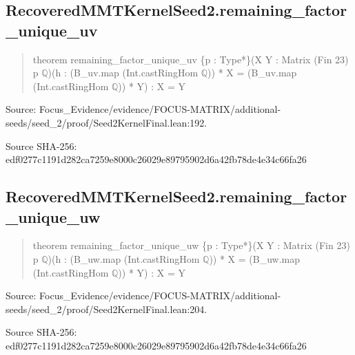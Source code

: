 \documentclass[11pt,a4paper]{article}
\begin{document}
\begin{samepage}
\subsection{RecoveredMMTKernelSeed2.remaining\_factor\_unique\_uv}
\begin{quote}\small\ttfamily theorem remaining\_factor\_unique\_uv \{p : Type*\}\newline     (X Y : Matrix (Fin 23) p \ensuremath{\mathbb{Q}})\newline     (h : (B\_uv.map (Int.castRingHom \ensuremath{\mathbb{Q}})) * X = (B\_uv.map (Int.castRingHom \ensuremath{\mathbb{Q}})) * Y) : X = Y\end{quote}
{\small Source: Focus\_Evidence/evidence/FOCUS-MATRIX/additional-seeds/seed\_2/proof/Seed2KernelFinal.lean:192.\par}

{\small Source SHA-256: edf0277c1191d282ca7259e8000c26029e89795902d6a42fb78de4e34c66fa26\par}

\end{samepage}
\begin{samepage}
\subsection{RecoveredMMTKernelSeed2.remaining\_factor\_unique\_uw}
\begin{quote}\small\ttfamily theorem remaining\_factor\_unique\_uw \{p : Type*\}\newline     (X Y : Matrix (Fin 23) p \ensuremath{\mathbb{Q}})\newline     (h : (B\_uw.map (Int.castRingHom \ensuremath{\mathbb{Q}})) * X = (B\_uw.map (Int.castRingHom \ensuremath{\mathbb{Q}})) * Y) : X = Y\end{quote}
{\small Source: Focus\_Evidence/evidence/FOCUS-MATRIX/additional-seeds/seed\_2/proof/Seed2KernelFinal.lean:204.\par}

{\small Source SHA-256: edf0277c1191d282ca7259e8000c26029e89795902d6a42fb78de4e34c66fa26\par}

\end{samepage}
\end{document}
